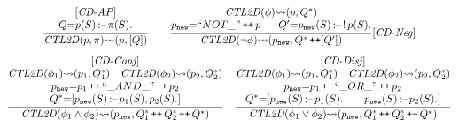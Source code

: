 \documentclass[acmsmall,screen,review,anonymous,nonacm]{acmart}
\begin{document}
\begin{figure*}[!h]
\vspace{-3mm}
\small
\centering
\begin{gather*}
\frac{
\begin{matrix}
[\mathit{CD}\text{-}\mathit{AP}]\\ 
Q {=} p(S) \,\text{:--}\, \pi(S).
\end{matrix}
}{\mathit{CTL2D}(p,\pi){\rightsquigarrow} (p, [Q])
}
\qquad 
\frac{
\begin{matrix} 
\mathit{CTL2D}(\phi){\rightsquigarrow} (p, Q^*) 
\\  p_{\mathtt{new}} {=} ``NOT\_" \operatorname{{\text{\ttfamily {++}}}} p \ \  \quad 
Q^\prime {=} p_{\mathtt{new}}(S) \,\text{:--}\,  !\,  p(S). 
\end{matrix}
}{ 
\mathit{CTL2D}(\neg\phi){\rightsquigarrow} (p_{\mathtt{new}}, Q^* \operatorname{{\text{\ttfamily {++}}}} [Q^\prime])
} [\mathit{CD}\text{-}\mathit{Neg}]
\\[0.5em] 
{
\frac{
\begin{matrix}
  [\mathit{CD}\text{-}\mathit{Conj}] \\
\mathit{CTL2D}(\phi_{1}){\rightsquigarrow} (p_{1}, Q^*_1) \quad 
\mathit{CTL2D}(\phi_{2}){\rightsquigarrow} (p_{2}, Q^*_2)\\ 
p_{\mathtt{new}} {=} p_{1} \operatorname{{\text{\ttfamily {++}}}}\ensuremath{``\_AND\_"} \operatorname{{\text{\ttfamily {++}}}}p_{2}
 \\ 
Q^* {=}  [p_{\mathtt{new}}(S) \,\text{:--}\,p_{1}(S),p_{2}(S).]
\end{matrix}
}{ 
\mathit{CTL2D}(\phi_{1} \land \phi_{2} ){\rightsquigarrow} (p_{\mathtt{new}}, Q^*_1 \operatorname{{\text{\ttfamily {++}}}}Q^*_2 \operatorname{{\text{\ttfamily {++}}}}Q^*)
    }
\quad 
}
\frac{
\begin{matrix}
  [\mathit{CD}\text{-}\mathit{Disj}]\\
\mathit{CTL2D}(\phi_{1}){\rightsquigarrow} (p_{1}, Q^*_1) \quad \mathit{CTL2D}(\phi_{2}){\rightsquigarrow} (p_{2}, Q^*_2)\\ 
p_{\mathtt{new}} {=} p_{1} \operatorname{{\text{\ttfamily {++}}}} ``\_OR\_" \operatorname{{\text{\ttfamily {++}}}} p_{2}
 \\  
Q^* {=}  [p_{\mathtt{new}}(S) \,\text{:--}\, p_{1}(S). \qquad p_{\mathtt{new}}(S) \,\text{:--}\, p_{2}(S).]
\end{matrix}
}{ 
\mathit{CTL2D}(\phi_{1} \lor \phi_{2} ){\rightsquigarrow} (p_{\mathtt{new}}, Q^*_1 \operatorname{{\text{\ttfamily {++}}}} Q^*_2 \operatorname{{\text{\ttfamily {++}}}} Q^*)
}
\end{gather*}
\end{figure*}
\end{document}
